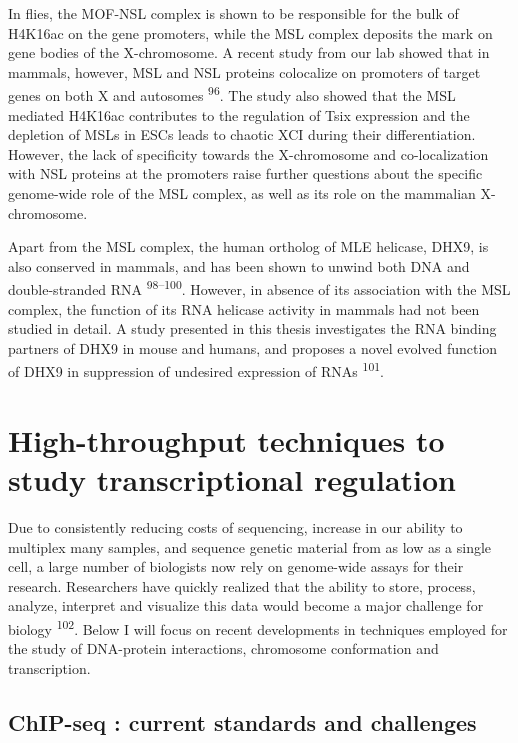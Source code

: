 \documentclass[11pt,twoside]{MPIthesis}
\theoremstyle{definition}
\theoremstyle{definition}
\theoremstyle{definition}
\theoremstyle{remark}
\begin{document}
In flies, the MOF-NSL complex is shown to be responsible for the bulk of
H4K16ac on the gene promoters, while the MSL complex deposits the mark
on gene bodies of the X-chromosome. A recent study from our lab showed
that in mammals, however, MSL and NSL proteins colocalize on promoters
of target genes on both X and autosomes \textsuperscript{96}. The study
also showed that the MSL mediated H4K16ac contributes to the regulation
of Tsix expression and the depletion of MSLs in ESCs leads to chaotic
XCI during their differentiation. However, the lack of specificity
towards the X-chromosome and co-localization with NSL proteins at the
promoters raise further questions about the specific genome-wide role of
the MSL complex, as well as its role on the mammalian X-chromosome.

Apart from the MSL complex, the human ortholog of MLE helicase, DHX9, is
also conserved in mammals, and has been shown to unwind both DNA and
double-stranded RNA \textsuperscript{98--100}. However, in absence of
its association with the MSL complex, the function of its RNA helicase
activity in mammals had not been studied in detail. A study presented in
this thesis investigates the RNA binding partners of DHX9 in mouse and
humans, and proposes a novel evolved function of DHX9 in suppression of
undesired expression of RNAs \textsuperscript{101}.

\section{High-throughput techniques to study transcriptional
regulation}\label{high-throughput-techniques-to-study-transcriptional-regulation}

Due to consistently reducing costs of sequencing, increase in our
ability to multiplex many samples, and sequence genetic material from as
low as a single cell, a large number of biologists now rely on
genome-wide assays for their research. Researchers have quickly realized
that the ability to store, process, analyze, interpret and visualize
this data would become a major challenge for biology
\textsuperscript{102}. Below I will focus on recent developments in
techniques employed for the study of DNA-protein interactions,
chromosome conformation and transcription.

\subsection{ChIP-seq : current standards and
challenges}\label{chip-seq-current-standards-and-challenges}
\end{document}
